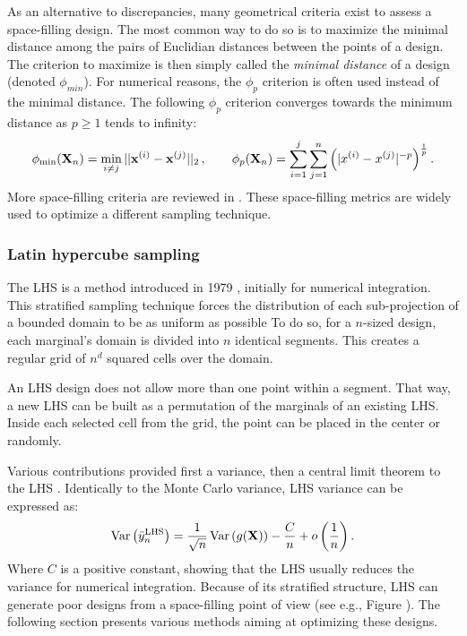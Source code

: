 As an alternative to discrepancies, many geometrical criteria exist to assess a space-filling design.
The most common way to do so is to maximize the minimal distance among the pairs of Euclidian distances between the points of a design.  
The criterion to maximize is then simply called the \textit{minimal distance} of a design (denoted $\phi_{min}$). 
For numerical reasons, the $\phi_p$ criterion is often used instead of the minimal distance. 
The following $\phi_p$ criterion converges towards the minimum distance as $p\geq1$ tends to infinity:
\begin{equation} 
    \phi_{\min}({\bf X}_n) = \min_{i \neq j} ||{\bf x}^{(i)} - {\bf x}^{(j)}||_2\, , \qquad
    \phi_p({\bf X}_n) = \sum_{i=1}^{j} \sum_{j=1}^{n} \left( |x^{(i)} - x^{(j)}|^{-p} \right)^{\frac{1}{p}}.
\end{equation}
More space-filling criteria are reviewed in \citet{abtini_2018}. 
These space-filling metrics are widely used to optimize a different sampling technique.


\subsubsection{Latin hypercube sampling}
The LHS is a method introduced in 1979 \citep{mckay_beckman_1979}, initially for numerical integration.
This stratified sampling technique forces the distribution of each sub-projection of a bounded domain to be as uniform as possible
To do so, for a $n$-sized design, each marginal's domain is divided into $n$ identical segments.
This creates a regular grid of $n^{d}$ squared cells over the domain. 

An LHS design does not allow more than one point within a segment. 
That way, a new LHS can be built as a permutation of the marginals of an existing LHS.
Inside each selected cell from the grid, the point can be placed in the center or randomly.

Various contributions provided first a variance, then a central limit theorem to the LHS \citep{owen_1996}.
Identically to the Monte Carlo variance, LHS variance can be expressed as:
\begin{equation}
    \operatorname{Var}\left(\Bar{y}_n^{\textrm{LHS}}\right) = \frac{1}{\sqrt{n}} \operatorname{Var}\left(g({\bf X})\right) - \frac{C}{n} + o\left( \frac1n \right). 
\end{equation}
Where $C$ is a positive constant, showing that the LHS usually reduces the variance for numerical integration. 
Because of its stratified structure, LHS can generate poor designs from a space-filling point of view (see e.g., Figure ). 
The following section presents various methods aiming at optimizing these designs.


